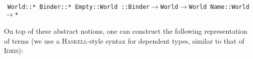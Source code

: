 \documentclass[9pt,authoryear]{sigplanconf}
\begin{document}
{\nopagebreak }

%
%
%
~\\~\vphantom{$\{$}\texttt{World}\texttt{\mbox{\hspace{0.50em}}}\texttt{{:}{:}}\texttt{\mbox{\hspace{0.50em}}}\texttt{*}\texttt{{\nopagebreak \newline%
}\vphantom{$\{$}}\texttt{Binder}\texttt{\mbox{\hspace{0.50em}}}\texttt{{:}{:}}\texttt{\mbox{\hspace{0.50em}}}\texttt{*}\texttt{{\nopagebreak \newline%
}\vphantom{$\{$}}\texttt{Empty}\texttt{\mbox{\hspace{0.50em}}}\texttt{{:}{:}}\texttt{\mbox{\hspace{0.50em}}}\texttt{World}\texttt{{\nopagebreak \newline%
}\vphantom{$\{$}}\texttt{\makebox[1.22ex][l]{$ {(} $}}\texttt{\makebox[1.22ex][c]{\ensuremath{\triangleleft}}}\texttt{\makebox[1.22ex][r]{$ {)} $}}\texttt{\mbox{\hspace{0.50em}}}\texttt{{:}{:}}\texttt{\mbox{\hspace{0.50em}}}\texttt{Binder}\texttt{\mbox{\hspace{0.50em}}}\texttt{$ \rightarrow $}\texttt{\mbox{\hspace{0.50em}}}\texttt{World}\texttt{\mbox{\hspace{0.50em}}}\texttt{$ \rightarrow $}\texttt{\mbox{\hspace{0.50em}}}\texttt{World}\texttt{{\nopagebreak \newline%
}\vphantom{$\{$}}\texttt{Name}\texttt{\mbox{\hspace{0.50em}}}\texttt{{:}{:}}\texttt{\mbox{\hspace{0.50em}}}\texttt{World}\texttt{\mbox{\hspace{0.50em}}}\texttt{$ \rightarrow $}\texttt{\mbox{\hspace{0.50em}}}\texttt{*}\texttt{{\nopagebreak \newline%
}\vphantom{$\{$}}%


%
%


%
On top of these abstract notions, one can construct the following
    representation of terms (we use a \textsc{Haskell}-style syntax for
    dependent types, similar to that of \textsc{Idris}){:}%
\end{document}
